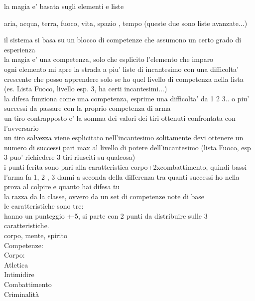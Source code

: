 \documentclass[12pt,a4paper]{book}
\begin{document}
la magia e' basata sugli elementi e liste

aria, acqua, terra, fuoco, vita, spazio , tempo (queste due sono liste avanzate...)
	
il sistema	si basa su un blocco di competenze che assumono un certo grado di esperienza\\

la magia e' una competenza, solo che esplicito l'elemento che imparo\\
ogni elemento mi apre la strada a piu' liste di incantesimo con una difficolta' crescente che posso apprendere solo se ho quel livello di competenza nella lista (es. Lista Fuoco, livello esp. 3, ha certi incantesimi...)\\

la difesa funziona come una competenza, esprime una difficolta' da 1 2 3.. o piu' successi da passare con la proprio competenza di arma\\

un tiro contrapposto e' la somma dei valori dei tiri ottenuti confrontata con l'avversario\\

un tiro salvezza viene esplicitato nell'incantesimo solitamente devi ottenere un numero di successi pari max al livello di potere dell'incantesimo (lista Fuoco, esp 3 puo' richiedere 3 tiri riusciti su qualcosa)\\

i punti ferita sono pari alla caratteristica corpo+2xcombattimento, quindi bassi\\

l'arma fa 1, 2 , 3 danni a seconda della differenza tra quanti successi ho nella prova al colpire e quanto hai difesa tu\\

la razza da la classe, ovvero da un set di competenze note di base\\

le caratteristiche sono tre:\\
hanno un punteggio +-5, si parte con 2 punti da distribuire sulle 3 caratteristiche.\\

corpo, mente, spirito\\

Competenze:\\

Corpo:\\
Atletica\\
Intimidire\\
Combattimento\\
Criminalità\\
\end{document}
